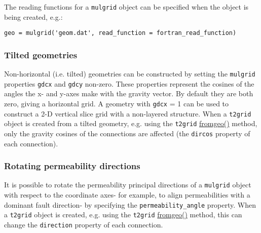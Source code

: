 The reading functions for a \texttt{mulgrid} object can be specified when the object is being created, e.g.:

\begin{lstlisting}
geo = mulgrid('geom.dat', read_function = fortran_read_function)
\end{lstlisting}

\subsubsection{Tilted geometries}

Non-horizontal (i.e. tilted) geometries can be constructed by setting the \texttt{mulgrid} properties \texttt{gdcx} and \texttt{gdcy} non-zero. These properties represent the cosines of the angles the x- and y-axes make with the gravity vector. By default they are both zero, giving a horizontal grid. A geometry with \texttt{gdcx} = 1 can be used to construct a 2-D vertical slice grid with a non-layered structure. When a \texttt{t2grid} object is created from a tilted geometry, e.g. using the \texttt{t2grid} \hyperref[sec:t2grid:fromgeo]{fromgeo()} method, only the gravity cosines of the connections are affected (the \texttt{dircos} property of each connection).

\subsubsection{Rotating permeability directions}

It is possible to rotate the permeability principal directions of a \texttt{mulgrid} object with respect to the coordinate axes- for example, to align permeabilities with a dominant fault direction- by specifying the \texttt{permeability\_angle} property. When a \texttt{t2grid} object is created, e.g. using the \texttt{t2grid} \hyperref[sec:t2grid:fromgeo]{fromgeo()} method, this can change the \texttt{direction} property of each connection.

